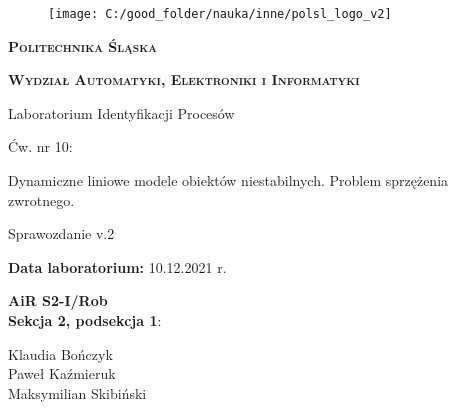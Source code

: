 \documentclass[11pt, a4paper]{article}
\begin{document}

\begin{titlepage}
{\LARGE
\begin{center}
	\begin{figure}[h!]
		\centering
		\texttt{[image: C:/good\_folder/nauka/inne/polsl\_logo\_v2]}
	\end{figure}
	
	\vspace{0.25cm}
	
	\textbf{\textsc{Politechnika Śląska}}
	
	\textbf{\textsc{Wydział Automatyki, Elektroniki i Informatyki}}
	
	\vspace{1.5cm}
	
	Laboratorium Identyfikacji Procesów
	
	\vspace{1.5cm}
	
	Ćw. nr 10:
	
	Dynamiczne liniowe modele obiektów niestabilnych. Problem sprzężenia zwrotnego.
	
	\vspace{0.5cm}
	
	{\Large Sprawozdanie v.2}
\end{center}
}

\vfill

{\Large
\noindent
\textbf{Data laboratorium:} 10.12.2021 r.

\vspace{0.5cm}

\noindent
\textbf{AiR S2-I/Rob}\\
\textbf{Sekcja 2, podsekcja 1}:

\noindent
\hspace*{0.5cm} Klaudia Bończyk\\
\hspace*{0.5cm} Paweł Kaźmieruk\\
\hspace*{0.5cm} Maksymilian Skibiński\\


\vspace{0.5cm}
}

\begin{center}
\end{center}
\end{titlepage}
\end{document}
